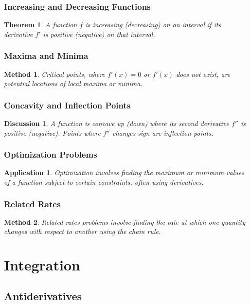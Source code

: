 \documentclass[a4paper,12pt]{book}
\newcounter{problem}
\newtheorem{theorem}{Theorem}
\newtheorem{application}{Application}
\newtheorem{method}{Method}
\newtheorem{discussion}{Discussion}
\begin{document}
\subsection{Increasing and Decreasing Functions}
\begin{theorem}
A function \( f \) is increasing (decreasing) on an interval if its derivative \( f' \) is positive (negative) on that interval.
\end{theorem}

\subsection{Maxima and Minima}
\begin{method}
Critical points, where \( f'(x) = 0 \) or \( f'(x) \) does not exist, are potential locations of local maxima or minima.
\end{method}

\subsection{Concavity and Inflection Points}
\begin{discussion}
A function is concave up (down) where its second derivative \( f'' \) is positive (negative). Points where \( f'' \) changes sign are inflection points.
\end{discussion}

\subsection{Optimization Problems}
\begin{application}
Optimization involves finding the maximum or minimum values of a function subject to certain constraints, often using derivatives.
\end{application}

\subsection{Related Rates}
\begin{method}
Related rates problems involve finding the rate at which one quantity changes with respect to another using the chain rule.
\end{method}

\chapter{Integration}
\section{Antiderivatives}
\end{document}
